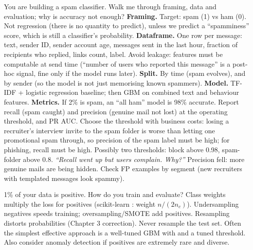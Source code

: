 \begin{qa}{ You are building a spam classifier. Walk me through framing, data and
evaluation; why is accuracy not enough?}
\why
\textbf{Framing.} Target: spam (1) vs ham (0). Not regression (there is no quantity to predict), unless we predict a ``spamminess''
score, which is still a classifier's probability.
\textbf{Dataframe.} One row per message: text, sender ID, sender account age, messages sent in the last hour, fraction of recipients
who replied, links count, label. Avoid leakage: features must be computable at send time (``number of users who reported this
message'' is a post-hoc signal, fine only if the model runs later).
\textbf{Split.} By time (spam evolves), and by sender (so the model is not just memorising known spammers).
\textbf{Model.} TF-IDF + logistic regression baseline; then GBM on combined text and behaviour features.
\textbf{Metrics.} If 2\% is spam, an ``all ham'' model is 98\% accurate. Report recall (spam caught) and precision (genuine mail not
lost) at the operating threshold, and PR AUC. Choose the threshold with business costs: losing a recruiter's interview invite to the
spam folder is worse than letting one promotional spam through, so precision of the spam label must be high; for phishing,
recall must be high. Possibly two thresholds: block above 0.98, spam-folder above 0.8.
\pushes \emph{``Recall went up but users complain. Why?''} Precision fell: more genuine mails are being hidden. Check FP examples by
segment (new recruiters with templated messages look spammy).
\end{qa}

\begin{qa}{ 1\% of your data is positive. How do you train and evaluate?}
\why Class weights multiply the loss for positives (scikit-learn : weight $n/(2n_c)$). Undersampling
negatives speeds training; oversampling/SMOTE add positives. Resampling distorts probabilities (Chapter 3 correction). Never resample the
test set. Often the simplest effective approach is a well-tuned GBM with  and a tuned threshold. Also consider
anomaly detection if positives are extremely rare and diverse.
\end{qa}

